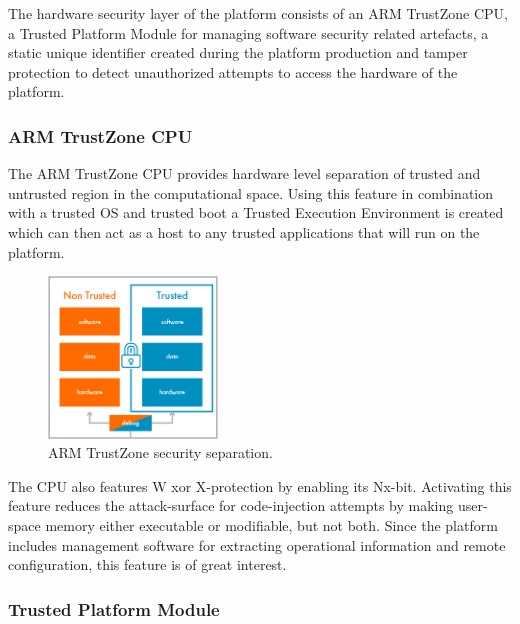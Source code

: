 \documentclass[10pt]{article}
\begin{document}
      The hardware security layer of the platform consists of an ARM TrustZone
      CPU, a Trusted Platform Module for managing software security related
      artefacts, a static unique identifier created during the platform
      production and tamper protection to detect unauthorized attempts to
      access the hardware of the platform.

      \subsubsection{ARM TrustZone CPU}

        The ARM TrustZone CPU provides hardware level separation of trusted and
        untrusted region in the computational space. Using this feature in
        combination with a trusted OS and trusted boot a Trusted Execution
        Environment is created which can then act as a host to any trusted
        applications that will run on the platform.

        \begin{figure}[!h]
          \center
          \includegraphics[width=0.4\textwidth]{input/arm_trust.jpg}
          \caption{ARM TrustZone security separation.}
        \end{figure}

        The CPU also features W xor X-protection by enabling its Nx-bit.
        Activating this feature reduces the attack-surface for code-injection
        attempts by making user-space memory either executable or modifiable,
        but not both. Since the platform includes management software for
        extracting operational information and remote configuration, this
        feature is of great interest.

      \subsubsection{Trusted Platform Module}
\end{document}
